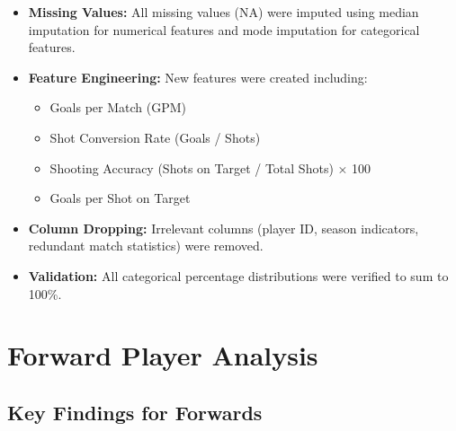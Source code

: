 \documentclass[12pt,a4paper]{article}
\begin{document}
\begin{itemize}[leftmargin=1.2cm, label=\textcolor{primary}{\faCheckCircle}]
    \item \textbf{Missing Values:} All missing values (NA) were imputed using median imputation for numerical features and mode imputation for categorical features.
    \item \textbf{Feature Engineering:} New features were created including:
        \begin{itemize}
            \item Goals per Match (GPM)
            \item Shot Conversion Rate (Goals / Shots)
            \item Shooting Accuracy (Shots on Target / Total Shots) × 100
            \item Goals per Shot on Target
        \end{itemize}
    \item \textbf{Column Dropping:} Irrelevant columns (player ID, season indicators, redundant match statistics) were removed.
    \item \textbf{Validation:} All categorical percentage distributions were verified to sum to 100\%.
\end{itemize}

\section{Forward Player Analysis}

\subsection{Key Findings for Forwards}
\end{document}
